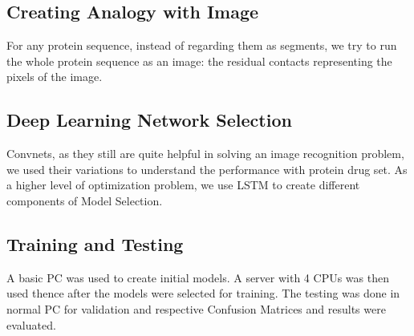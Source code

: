 \subsection{Creating Analogy with Image}
For any protein sequence, instead of regarding them as segments, we try to run the whole protein sequence as an image: the residual contacts representing the pixels of the image.

\subsection{Deep Learning Network Selection}
Convnets, as they still are quite helpful in solving an image recognition problem, we used their variations to understand the performance with protein drug set. As a higher level of optimization problem, we use LSTM to create different components of Model Selection. 

\subsection{Training and Testing}
A basic PC was used to create initial models. A server with 4 CPUs was then used thence after the models were selected for training. The testing was done in normal PC for validation and respective Confusion Matrices and results were evaluated.
